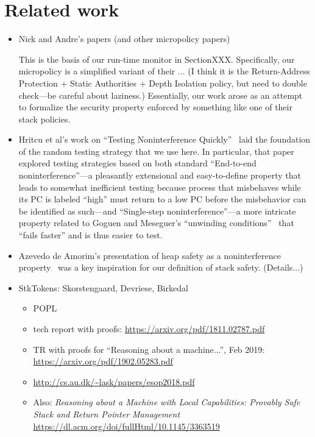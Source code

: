 \documentclass[conference]{IEEEtran}
\begin{document}
\section{Related work}

\begin{itemize}
\item Nick and Andre's papers (and other micropolicy papers)
\cite{DBLP:conf/sp/RoesslerD18}

This is the basis of our run-time monitor in Section{XXX}.  Specifically,
our micropolicy is a simplified variant of their ... (I think it is the
Return-Address Protection + Static Authorities + Depth Isolation policy, but
need to double check---be careful about laziness.)  Essentially, our work
arose as an attempt to formalize the security property enforced by something
like one of their stack policies.

\item Hritcu et al's work on ``Testing Noninterference
Quickly''~\cite{DBLP:journals/jfp/HritcuLSADHPV16} laid the
foundation of the random testing strategy that we use here.  In particular,
that paper explored testing strategies based on both standard ``End-to-end
noninterference''---a pleasantly extensional and easy-to-define property
that leads to somewhat inefficient testing because process that misbehaves
while its PC is labeled ``high'' must return to a low PC before the
misbehavior can be identified as such---and ``Single-step
noninterference''---a more intricate property related to Goguen and
Meseguer's ``unwinding conditions''~\cite{GoguenMeseguer85} that ``fails
faster'' and is thus easier to test.  

\item Azevedo de Amorim's presentation of heap safety as a noninterference
property~\cite{DBLP:conf/post/AmorimHP18} was a key inspiration for our
definition of stack safety.  (Details...)

\item StkTokens: Skorstengaard, Devriese, Birkedal
\begin{itemize}
\item POPL \cite{skorstengaard2019stktokens}
\item tech report with proofs: \cite{skorstengaard2018stktokens}
\url{https://arxiv.org/pdf/1811.02787.pdf}
\item TR with proofs for ``Reasoning about a machine...'', Feb 2019:
\url{https://arxiv.org/pdf/1902.05283.pdf}
\item \url{http://cs.au.dk/~lask/papers/esop2018.pdf}
\item Also: {\em Reasoning about a Machine with Local Capabilities: Provably
  Safe Stack and Return Pointer Management} \cite{10.1145/3363519}
\url{https://dl.acm.org/doi/fullHtml/10.1145/3363519}


\end{itemize}
\end{itemize}
\end{document}
